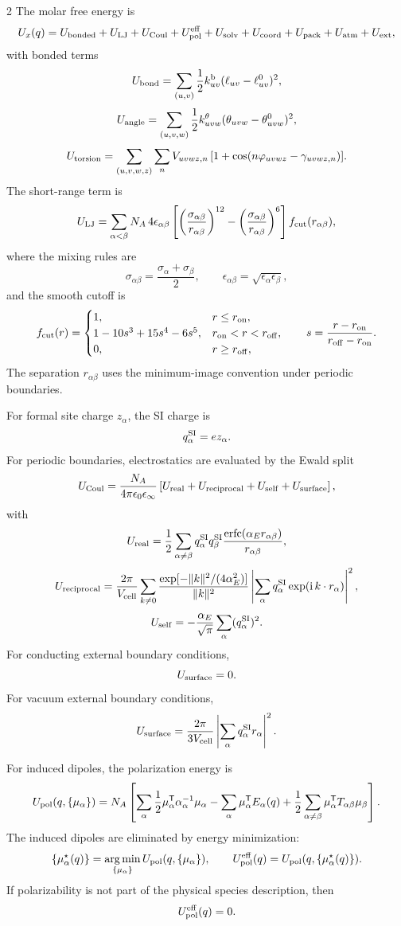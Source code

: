 \documentclass[10pt]{article}
\newcommand{\T}{\mathsf{T}}
\newcommand{\argmin}{\operatorname*{arg\,min}}
\begin{document}
\begin{multicols}{2}
The molar free energy is
\[
U_x(q)=
U_{\rm bonded}
+
U_{\rm LJ}
+
U_{\rm Coul}
+
U_{\rm pol}^{\rm eff}
+
U_{\rm solv}
+
U_{\rm coord}
+
U_{\rm pack}
+
U_{\rm atm}
+
U_{\rm ext},
\]
with bonded terms
\[
U_{\rm bond}
=
\sum_{(u,v)}\frac12k_{uv}^{\rm b}(\ell_{uv}-\ell_{uv}^0)^2,
\]
\[
U_{\rm angle}
=
\sum_{(u,v,w)}\frac12k_{uvw}^{\theta}(\theta_{uvw}-\theta_{uvw}^0)^2,
\]
\[
U_{\rm torsion}
=
\sum_{(u,v,w,z)}\sum_n
V_{uv wz,n}\,[1+\cos(n\varphi_{uv wz}-\gamma_{uv wz,n})].
\]
The short-range term is
\[
U_{\rm LJ}
=
\sum_{\alpha<\beta}
N_A\,4\epsilon_{\alpha\beta}
\left[
\left(\frac{\sigma_{\alpha\beta}}{r_{\alpha\beta}}\right)^{12}
-
\left(\frac{\sigma_{\alpha\beta}}{r_{\alpha\beta}}\right)^6
\right]
f_{\rm cut}(r_{\alpha\beta}),
\]
where the mixing rules are
\[
\sigma_{\alpha\beta}
=
\frac{\sigma_\alpha+\sigma_\beta}{2},
\qquad
\epsilon_{\alpha\beta}
=
\sqrt{\epsilon_\alpha\epsilon_\beta},
\]
and the smooth cutoff is
\[
f_{\rm cut}(r)
=
\begin{cases}
1, & r\le r_{\rm on},\\
1-10s^3+15s^4-6s^5, & r_{\rm on}<r<r_{\rm off},\\
0, & r\ge r_{\rm off},
\end{cases}
\qquad
s=\frac{r-r_{\rm on}}{r_{\rm off}-r_{\rm on}}.
\]
The separation \(r_{\alpha\beta}\) uses the minimum-image convention under
periodic boundaries.

For formal site charge \(z_\alpha\), the SI charge is
\[
q_\alpha^{\rm SI}=e z_\alpha.
\]
For periodic boundaries, electrostatics are evaluated by the Ewald split
\[
U_{\rm Coul}
=
\frac{N_A}{4\pi\epsilon_0\epsilon_\infty}
\left[
U_{\rm real}
+
U_{\rm reciprocal}
+
U_{\rm self}
+
U_{\rm surface}
\right],
\]
with
\[
U_{\rm real}
=
\frac12
\sum_{\alpha\ne\beta}
q_\alpha^{\rm SI}q_\beta^{\rm SI}
\frac{\operatorname{erfc}(\alpha_E r_{\alpha\beta})}{r_{\alpha\beta}},
\]
\[
U_{\rm reciprocal}
=
\frac{2\pi}{V_{\rm cell}}
\sum_{k\ne0}
\frac{\exp[-\|k\|^2/(4\alpha_E^2)]}{\|k\|^2}
\left|
\sum_\alpha q_\alpha^{\rm SI}
\exp(\mathrm i\, k\cdot r_\alpha)
\right|^2,
\]
\[
U_{\rm self}
=
-\frac{\alpha_E}{\sqrt{\pi}}
\sum_\alpha (q_\alpha^{\rm SI})^2.
\]
For conducting external boundary conditions,
\[
U_{\rm surface}=0.
\]
For vacuum external boundary conditions,
\[
U_{\rm surface}
=
\frac{2\pi}{3V_{\rm cell}}
\left|
\sum_\alpha q_\alpha^{\rm SI}r_\alpha
\right|^2.
\]

For induced dipoles, the polarization energy is
\[
U_{\rm pol}(q,\{\mu_\alpha\})
=
N_A
\left[
\sum_\alpha
\frac12
\mu_\alpha^\T\alpha_\alpha^{-1}\mu_\alpha
-
\sum_\alpha \mu_\alpha^\T E_\alpha(q)
+
\frac12
\sum_{\alpha\ne\beta}
\mu_\alpha^\T T_{\alpha\beta}\mu_\beta
\right].
\]
The induced dipoles are eliminated by energy minimization:
\[
\{\mu_\alpha^\star(q)\}
=
\argmin_{\{\mu_\alpha\}}
U_{\rm pol}(q,\{\mu_\alpha\}),
\qquad
U_{\rm pol}^{\rm eff}(q)
=
U_{\rm pol}(q,\{\mu_\alpha^\star(q)\}).
\]
If polarizability is not part of the physical species description, then
\[
U_{\rm pol}^{\rm eff}(q)=0.
\]


\end{multicols}
\end{document}
